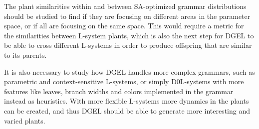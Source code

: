 The plant similarities within and between SA-optimized grammar distributions should be studied to find if they are focusing on different areas in the parameter space, or if all are focusing on the same space.
This would require a metric for the similarities between L-system plants, which is also the next step for DGEL to be able to cross different L-systems in order to produce offspring that are similar to its parents.

It is also necessary to study how DGEL handles more complex grammars, such as parametric and context-sensitive L-systems, or simply D0L-systems with more features like leaves, branch widths and colors implemented in the grammar instead as heuristics.
With more flexible L-systems more dynamics in the plants can be created, and thus DGEL should be able to generate more interesting and varied plants.
